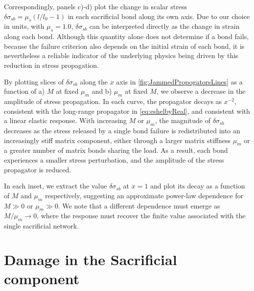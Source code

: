 \documentclass[asymmetricmargins]{library/duthesis}%
\begin{document}
Correspondingly, panels c)-d) plot the change in scalar stress $\delta \sigma_{sb} = \mu_s\left(l/l_0 -1 \right)$ in each sacrificial bond along its own axis. Due to our choice in units, with $\mu_s=1.0$, $\delta \sigma_{sb}$ can be interpreted directly as the change in strain along each bond. Although this quantity alone does not determine if a bond fails, because the failure criterion also depends on the initial strain of each bond, it is nevertheless a reliable indicator of the underlying physics being driven by this reduction in stress propagation. 

By plotting slices of $\delta \sigma_{sb}$ along the $x$ axis in \cref{fig:JammedPropogatorsLines} as a function of a) $M$ at fixed $\mu_m$ and b) $\mu_m$ at fixed $M$, we observe a decrease in the amplitude of stress propagation. In each curve, the propagator decays as $x^{-2}$, consistent with the long-range propagator in \cref{eq:eshelbyReal}, and consistent with a linear elastic response. With increasing $M$ or $\mu_m$, the magnitude of $\delta \sigma_{sb}$ decreases as the stress released by a single bond failure is redistributed into an increasingly stiff matrix component, either through a larger matrix stiffness $\mu_m$ or a greater number of matrix bonds sharing the load. As a result, each bond experiences a smaller stress perturbation, and the amplitude of the stress propagator is reduced.

In each inset, we extract the value $\delta \sigma_{sb}$ at $x = 1$ and plot its decay as a function of $M$ and $\mu_m$ respectively, suggesting an approximate power-law dependence for $M \gg 0$ or $\mu_m \gg 0$. We note that a different dependence must emerge as $M/\mu_m \to 0$, where the response must recover the finite value associated with the single sacrificial network.

\section{Damage in the Sacrificial component}
\end{document}
